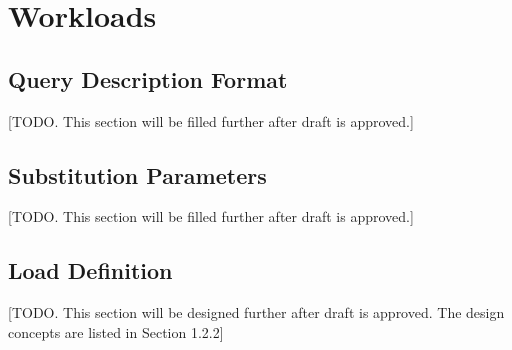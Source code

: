 \chapter{Workloads}
\label{sec:workloads}

\section{Query Description Format}
[TODO. This section will be filled further after draft is approved.]


\section{Substitution Parameters}
[TODO. This section will be filled further after draft is approved.]


\section{Load Definition}
[TODO. This section will be designed further after draft is approved. The design concepts are listed in Section 1.2.2]

